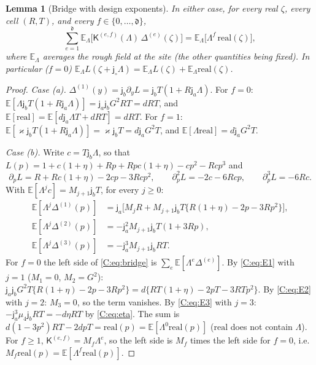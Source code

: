 \documentclass[11pt]{article}
\newtheorem{lemma}[lemma]{Lemma}
\newcommand{\E}{\mathbb{E}}
\newcommand{\ja}{\mathsf{j}_a}
\newcommand{\jb}{\mathsf{j}_b}
\newcommand{\jsh}{\mathsf{j}_\circ}
\newcommand{\dg}{\mathfrak{d}}
\newcommand{\K}{\mathsf{K}}
\newcommand{\real}{\mathrm{real}}
\begin{document}
\begin{lemma}[Bridge with design exponents]\label{C:lem:bridge}
In either case, for every real \(\zeta\), every cell \((R,T)\), and every
\(f\in\{0,\dots,\dg\}\),
\begin{equation}
 \sum_{e=1}^{\dg}\E_\Lambda\bigl[\K^{(e,f)}(\Lambda)\,\Delta^{(e)}(\zeta)\bigr]
 =\E_\Lambda\bigl[\Lambda^f\,\real(\zeta)\bigr],
 \label{C:eq:bridge}
\end{equation}
where \(\E_\Lambda\) averages the rough field at the site (the other
quantities being fixed).  In particular (\(f=0\))
\(\E_\Lambda L(\zeta+\jsh\Lambda)=\E_\Lambda L(\zeta)+\E_\Lambda\real(\zeta)\).
\end{lemma}

\begin{proof}
\emph{Case (a).}  \(\Delta^{(1)}(y)=\jb\partial_yL=\jb T(1+R\ja\Lambda)\).
For \(f=0\): \(\E[\Lambda\jb T(1+R\ja\Lambda)]=\ja\jb G^2RT=dRT\), and
\(\E[\real]=\E[d\ja\Lambda T+dRT]=dRT\).  For \(f=1\):
\(\E[\varkappa\jb T(1+R\ja\Lambda)]=\varkappa\jb T=d\ja G^2T\), and
\(\E[\Lambda\real]=d\ja G^2T\).

\emph{Case (b).}  Write \(c=T\jb\Lambda\), so that
\(L(p)=1+c(1+\eta)+Rp+Rpc(1+\eta)-cp^2-Rcp^3\) and
\[
 \partial_pL=R+Rc(1+\eta)-2cp-3Rcp^2,\qquad
 \partial_p^2L=-2c-6Rcp,\qquad
 \partial_p^3L=-6Rc .
\]
With \(\E[\Lambda^jc]=M_{j+1}\jb T\), for every \(j\ge0\):
\begin{align}
 \E[\Lambda^j\Delta^{(1)}(p)]&=\ja\bigl[M_jR+M_{j+1}\jb T\{R(1+\eta)-2p-3Rp^2\}\bigr],
 \label{C:eq:E1}\\
 \E[\Lambda^j\Delta^{(2)}(p)]&=-\ja^2M_{j+1}\jb T(1+3Rp),
 \label{C:eq:E2}\\
 \E[\Lambda^j\Delta^{(3)}(p)]&=-\ja^3M_{j+1}\jb RT .
 \label{C:eq:E3}
\end{align}
For \(f=0\) the left side of \eqref{C:eq:bridge} is
\(\sum_e\E[\Lambda^e\Delta^{(e)}]\).  By \eqref{C:eq:E1} with \(j=1\)
(\(M_1=0\), \(M_2=G^2\)): \(\ja\jb G^2T\{R(1+\eta)-2p-3Rp^2\}
=d\{RT(1+\eta)-2pT-3RTp^2\}\).  By \eqref{C:eq:E2} with \(j=2\): \(M_3=0\),
so the term vanishes.  By \eqref{C:eq:E3} with \(j=3\):
\(-\ja^3\mu_4\jb RT=-d\eta RT\) by \eqref{C:eq:eta}.  The sum is
\(d(1-3p^2)RT-2dpT=\real(p)=\E[\Lambda^0\real(p)]\) (\(\real\) does not
contain \(\Lambda\)).  For \(f\ge1\), \(\K^{(e,f)}=M_f\Lambda^e\), so the
left side is \(M_f\) times the left side for \(f=0\), i.e.\
\(M_f\real(p)=\E[\Lambda^f\real(p)]\).
\end{proof}
\end{document}
